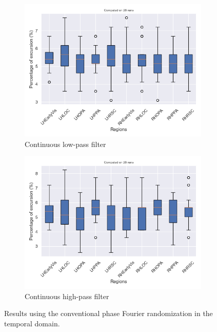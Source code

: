 \begin{figure}
    \centering
    \begin{subfigure}{.45\textwidth}
        \centering
        \includegraphics[width=\textwidth]{img/low_continuous_filter_Fourier_randomization.png}
        \caption{Continuous low-pass filter}
    \end{subfigure}
    \hfill
    \begin{subfigure}{.45\textwidth}
        \centering
        \includegraphics[width=\textwidth]{img/high_continuous_filter_Fourier_randomization.png}
        \caption{Continuous high-pass filter}
    \end{subfigure}
    \caption{Results using the conventional phase Fourier randomization in the temporal domain.}
    \label{fig:result_Fourier_excursions}
\end{figure}